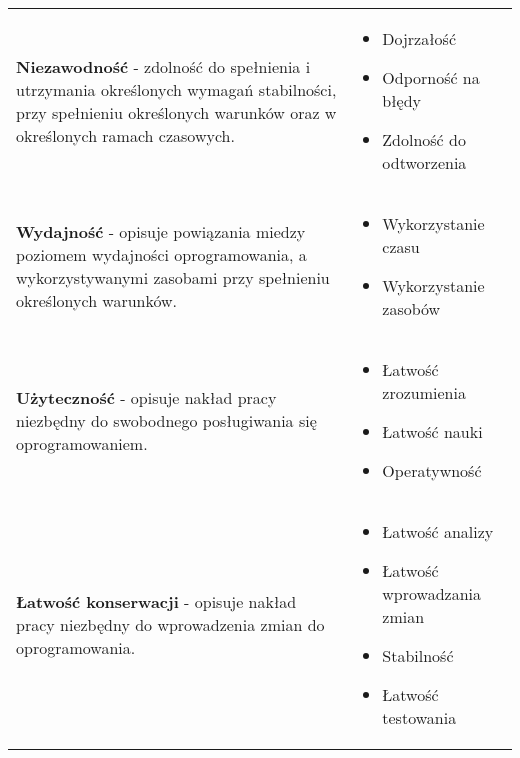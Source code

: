 \documentclass[../main.tex]{subfiles}
\begin{document}
    \begin{table}[H]
        \begin{center}
            \begin{tabular}{  p{8cm} p{8cm} }
                \textbf{Niezawodność} - zdolność do spełnienia i utrzymania
                określonych wymagań stabilności, przy spełnieniu określonych
                warunków oraz w określonych ramach czasowych.
                &
                \begin{itemize}
                    \item Dojrzałość
                    \item Odporność na błędy
                    \item Zdolność do odtworzenia
                \end{itemize}
                \\

                \cmidrule(r){1-1}\cmidrule(l){2-2}

                \textbf{Wydajność} - opisuje powiązania miedzy poziomem wydajności oprogramowania, a
                wykorzystywanymi zasobami przy spełnieniu określonych warunków.
                &
                \begin{itemize}
                    \item Wykorzystanie czasu
                    \item Wykorzystanie zasobów
                \end{itemize}
                \\

                \cmidrule(r){1-1}\cmidrule(l){2-2}

                \textbf{Użyteczność} - opisuje nakład pracy niezbędny do swobodnego posługiwania się oprogramowaniem.
                &
                \begin{itemize}
                    \item Łatwość zrozumienia
                    \item Łatwość nauki
                    \item Operatywność
                \end{itemize}
                \\

                \cmidrule(r){1-1}\cmidrule(l){2-2}

                \textbf{Łatwość konserwacji} - opisuje nakład pracy niezbędny do wprowadzenia zmian do oprogramowania.
                &
                \begin{itemize}
                    \item Łatwość analizy
                    \item Łatwość wprowadzania zmian
                    \item Stabilność
                    \item Łatwość testowania
                \end{itemize}
                \\


\end{tabular}
\end{center}
\end{table}
\end{document}

